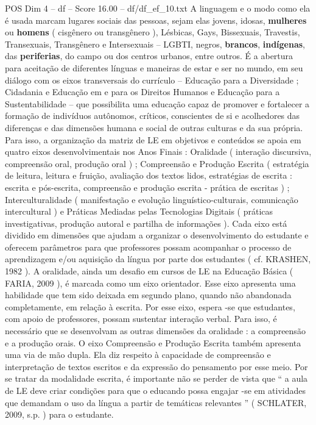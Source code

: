 \begin{textsample}{POS Dim 4 – df – Score 16.00 – df/df\_ef\_10.txt}
A linguagem e o modo como ela é usada marcam lugares sociais das pessoas, sejam elas jovens, idosas, \textbf{mulheres} ou \textbf{homens} ( cisgênero ou transgênero ), Lésbicas, Gays, Bissexuais, Travestis, Transexuais, Transgênero e Intersexuais – LGBTI, negros, \textbf{brancos}, \textbf{indígenas}, das \textbf{periferias}, do campo ou dos centros urbanos, entre outros.
É a abertura para aceitação de diferentes línguas e maneiras de estar e ser no mundo, em seu diálogo com os eixos transversais do currículo – Educação para a Diversidade ; Cidadania e Educação em e para os Direitos Humanos e Educação para a Sustentabilidade – que possibilita uma educação capaz de promover e fortalecer a formação de indivíduos autônomos, críticos, conscientes de si e acolhedores das diferenças e das dimensões humana e social de outras culturas e da sua própria.
Para isso, a organização da matriz de LE em objetivos e conteúdos se apoia em quatro eixos desenvolvimentais nos Anos Finais : Oralidade ( interação discursiva, compreensão oral, produção oral ) ; Compreensão e Produção Escrita ( estratégia de leitura, leitura e fruição, avaliação dos textos lidos, estratégias de escrita : escrita e pós-escrita, compreensão e produção escrita - prática de escritas ) ; Interculturalidade ( manifestação e evolução linguístico-culturais, comunicação intercultural ) e Práticas Mediadas pelas Tecnologias Digitais ( práticas investigativas, produção autoral e partilha de informações ).
Cada eixo está dividido em dimensões que ajudam a organizar o desenvolvimento do estudante e oferecem parâmetros para que professores possam acompanhar o processo de aprendizagem e/ou aquisição da língua por parte dos estudantes ( cf.
KRASHEN, 1982 ).
A oralidade, ainda um desafio em cursos de LE na Educação Básica ( FARIA, 2009 ), é marcada como um eixo orientador.
Esse eixo apresenta uma habilidade que tem sido deixada em segundo plano, quando não abandonada completamente, em relação à escrita.
Por esse eixo, espera -se que estudantes, com apoio de professores, possam sustentar interação verbal.
Para isso, é necessário que se desenvolvam as outras dimensões da oralidade : a compreensão e a produção orais.
O eixo Compreensão e Produção Escrita também apresenta uma via de mão dupla.
Ela diz respeito à capacidade de compreensão e interpretação de textos escritos e da expressão do pensamento por esse meio.
Por se tratar da modalidade escrita, é importante não se perder de vista que “ a aula de LE deve criar condições para que o educando possa engajar -se em atividades que demandam o uso da língua a partir de temáticas relevantes ” ( SCHLATER, 2009, s.p. ) para o estudante.

\end{textsample}
